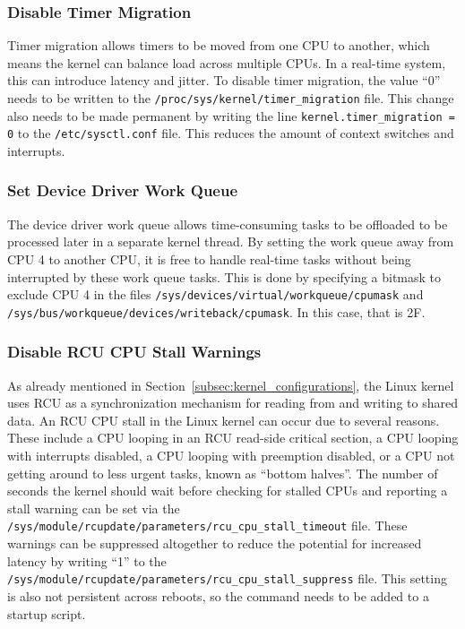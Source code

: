 \documentclass[MMR,Master,english]{style/twbook}
\begin{document}
\clearpage

\subsubsection{Disable Timer Migration}
Timer migration allows timers to be moved from one CPU to another, which means the kernel can balance load across multiple CPUs. In a real-time system, this can introduce latency and jitter. To disable timer migration, the value ``0'' needs to be written to the \texttt{/proc/sys/kernel/timer\_migration} file. This change also needs to be made permanent by writing the line \texttt{kernel.timer\_migration = 0} to the \texttt{/etc/sysctl.conf} file. This reduces the amount of context switches and interrupts.

\subsubsection{Set Device Driver Work Queue}
The device driver work queue allows time-consuming tasks to be offloaded to be processed later in a separate kernel thread. By setting the work queue away from CPU 4 to another CPU, it is free to handle real-time tasks without being interrupted by these work queue tasks. This is done by specifying a bitmask to exclude CPU 4 in the files \texttt{/sys/devices/virtual/workqueue/cpumask} and \texttt{/sys/bus/workqueue/devices/writeback/cpumask}. In this case, that is 2F.

\subsubsection{Disable RCU CPU Stall Warnings}
As already mentioned in Section~\ref{subsec:kernel_configurations}, the Linux kernel uses RCU as a synchronization mechanism for reading from and writing to shared data. An RCU CPU stall in the Linux kernel can occur due to several reasons. These include a CPU looping in an RCU read-side critical section, a CPU looping with interrupts disabled, a CPU looping with preemption disabled, or a CPU not getting around to less urgent tasks, known as “bottom halves”. The number of seconds the kernel should wait before checking for stalled CPUs and reporting a stall warning can be set via the \texttt{/sys/module/rcupdate/parameters/rcu\_cpu\_stall\_timeout} file. These warnings can be suppressed altogether to reduce the potential for increased latency by writing ``1'' to the \texttt{/sys/module/rcupdate/parameters/rcu\_cpu\_stall\_suppress} file. This setting is also not persistent across reboots, so the command needs to be added to a startup script.
\end{document}
